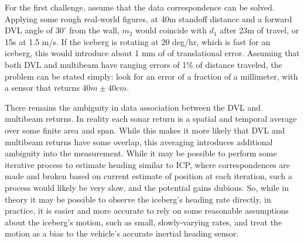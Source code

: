 For the first challenge, assume that the data correspondence can be solved. Applying some rough real-world figures, at 40m standoff distance and a forward DVL angle of $30^\circ$ from the wall, $m_2$ would coincide with $d_1$ after 23m of travel, or 15s at 1.5 m/s. If the iceberg is rotating at 20 deg/hr, which is fast for an iceberg, this would introduce about 1 mm of of translational error. Assuming that both DVL and multibeam have ranging errors of 1\% of distance traveled, the problem can be stated simply: look for an error of a fraction of a millimeter, with a sensor that returns $40m \pm 40 cm$.

There remains the ambiguity in data association between the DVL and multibeam returns. In reality each sonar return is a spatial and temporal average over some finite area and span. While this makes it more likely that DVL and multibeam returns have some overlap, this averaging introduces additional ambiguity into the measurement. While it may be possible to perform some iterative process to estimate heading similar to ICP, where correspondences are made and broken based on current estimate of position at each iteration, such a process would likely be very slow, and the potential gains dubious. So, while in theory it may be possible to observe the iceberg's heading rate directly, in practice, it is easier and more accurate to rely on some reasonable assumptions about the iceberg's motion, such as small, slowly-varying rates, and treat the motion as a bias to the vehicle's accurate inertial heading sensor.






